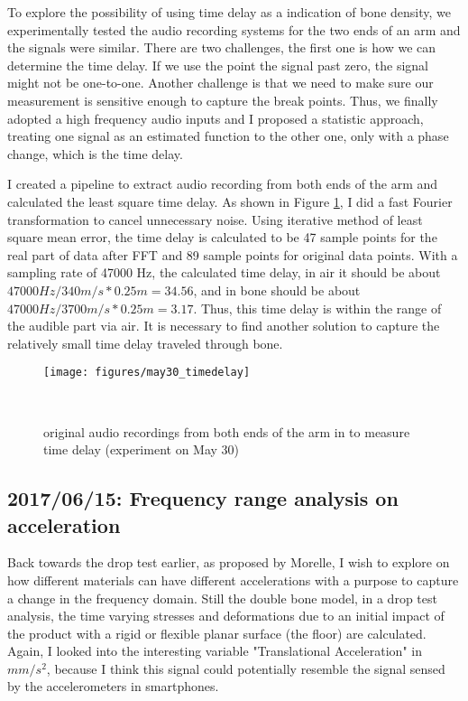\documentclass{sigchi}
\begin{document}
To explore the possibility of using time delay as a indication of bone density, we experimentally tested the audio recording systems for the two ends of an arm and the signals were similar. There are two challenges, the first one is how we can determine the time delay. If we use the point the signal past zero, the signal might not be one-to-one. Another challenge is that we need to make sure our measurement is sensitive enough to capture the break points. Thus, we finally adopted a high frequency audio inputs and I proposed a statistic approach, treating one signal as an estimated function to the other one, only with a phase change, which is the time delay.

I created a pipeline to extract audio recording from both ends of the arm and calculated the least square time delay. As shown in Figure \ref{fig:may30_timedelay}, I did a fast Fourier transformation to cancel unnecessary noise. Using iterative method of least square mean error, the time delay is calculated to be 47 sample points for the real part of data after FFT and 89 sample points for original data points. With a sampling rate of 47000 Hz, the calculated time delay, in air it should be about $47000Hz/340m/s*0.25m = 34.56$, and in bone should be about $47000Hz/3700m/s*0.25m = 3.17$. Thus, this time delay is within the range of the audible part via air. It is necessary to find another solution to capture the relatively small time delay traveled through bone.

\begin{figure}
  \centering
  \texttt{[image: figures/may30\_timedelay]}
  \caption{original audio recordings from both ends of the arm in to measure time delay (experiment on May 30)}
    ~\label{fig:may30_timedelay}
\end{figure}

\subsection{2017/06/15: Frequency range analysis on acceleration}

Back towards the drop test earlier, as proposed by Morelle, I wish to explore on how different materials can have different accelerations with a purpose to capture a change in the frequency domain. Still the double bone model, in a drop test analysis, the time varying stresses and deformations due to an initial impact of the product with a rigid or flexible planar surface (the floor) are calculated. Again, I looked into the interesting variable "Translational Acceleration" in $mm/s^2$, because I think this signal could potentially resemble the signal sensed by the accelerometers in smartphones.
\end{document}
